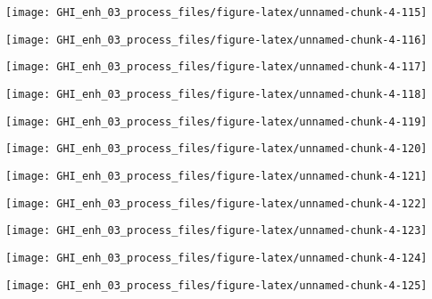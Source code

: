 \documentclass[
  10pt,
  a4paper,oneside]{article}
\begin{document}
\begin{center}\texttt{[image: GHI\_enh\_03\_process\_files/figure-latex/unnamed-chunk-4-115]} \end{center}

\begin{center}\texttt{[image: GHI\_enh\_03\_process\_files/figure-latex/unnamed-chunk-4-116]} \end{center}

\begin{center}\texttt{[image: GHI\_enh\_03\_process\_files/figure-latex/unnamed-chunk-4-117]} \end{center}

\begin{center}\texttt{[image: GHI\_enh\_03\_process\_files/figure-latex/unnamed-chunk-4-118]} \end{center}

\begin{center}\texttt{[image: GHI\_enh\_03\_process\_files/figure-latex/unnamed-chunk-4-119]} \end{center}

\begin{center}\texttt{[image: GHI\_enh\_03\_process\_files/figure-latex/unnamed-chunk-4-120]} \end{center}

\begin{center}\texttt{[image: GHI\_enh\_03\_process\_files/figure-latex/unnamed-chunk-4-121]} \end{center}

\begin{center}\texttt{[image: GHI\_enh\_03\_process\_files/figure-latex/unnamed-chunk-4-122]} \end{center}

\begin{center}\texttt{[image: GHI\_enh\_03\_process\_files/figure-latex/unnamed-chunk-4-123]} \end{center}

\begin{center}\texttt{[image: GHI\_enh\_03\_process\_files/figure-latex/unnamed-chunk-4-124]} \end{center}

\begin{center}\texttt{[image: GHI\_enh\_03\_process\_files/figure-latex/unnamed-chunk-4-125]} \end{center}
\end{document}
